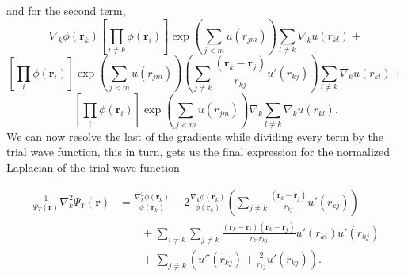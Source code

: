 \documentclass[11pt,a4paper,titlepage]{article}
\begin{document}
and for the second term, 
\begin{equation*}
\nabla_k\phi(\mathbf{r}_k)\left[\prod_{i\ne k}\phi(\mathbf{r}_i)\right]\exp{\left(\sum_{j<m}u(r_{jm})\right)}\sum_{l\ne k}\nabla_k u(r_{kl}) + 
\end{equation*}
\begin{equation*}
\left[\prod_{i}\phi(\mathbf{r}_i)\right]\exp{\left(\sum_{j<m}u(r_{jm})\right)}\left(\sum_{j\ne k}\frac{(\mathbf{r}_k-\mathbf{r}_j)}{r_{kj}}u'(r_{kj})\right)\sum_{l\ne k}\nabla_k u(r_{kl}) + 
\end{equation*}
\begin{equation*}
\left[\prod_i\phi(\mathbf{r}_i)\right]
  \exp{\left(\sum_{j<m}u(r_{jm})\right)}\nabla_k\sum_{l\ne k}\nabla_k u(r_{kl}).
\end{equation*}
We can now resolve the last of the gradients while dividing every term by the trial wave function, this in turn, gets us the final expression for the normalized Laplacian of the trial wave function

\begin{align}
   \frac{1}{\Psi_T(\mathbf{r})}\nabla_k^2\Psi_T(\mathbf{r})
   &= \frac{\nabla_k^2\phi(\mathbf{r}_k)}{\phi(\mathbf{r}_k)}
   + 2\frac{\nabla_k\phi(\mathbf{r}_k)}{\phi(\mathbf{r}_k)}
   \left(\sum_{j\ne k}\frac{(\mathbf{r}_k-\mathbf{r}_j)}{r_{kj}}u'(r_{kj})\right)
   \\
   &\qquad
   + \sum_{i\ne k}\sum_{j \ne k}\frac{(\mathbf{r}_k-\mathbf{r}_i)(\mathbf{r}_k-\mathbf{r}_j)}{r_{ki}r_{kj}}u'(r_{ki})u'(r_{kj})
   \\
   &\qquad
   + \sum_{j\ne k}\left( u''(r_{kj})+\frac{2}{r_{kj}}u'(r_{kj})\right).
\end{align}


\end{document}
